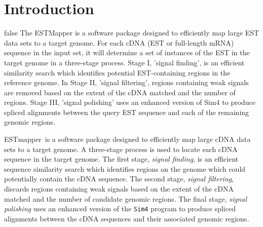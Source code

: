 \documentclass[twoside,11pt]{book}
\begin{document}
\pagestyle{fancy}

\rhead[]{}
\lhead[\today]{\today}


\newcommand{\ESTmapper}{{\sc ESTmapper}}

\normalem

%

\tableofcontents


\chapter{Introduction}
\label{chap:intro}

\if false
The ESTMapper is a software package designed to efficiently map large EST data
sets to a target genome. For each cDNA (EST or full-length mRNA) sequence
in the input set, it will determine a set of instances of the EST in the
target genome in a three-stage process. Stage I, 'signal finding', is an
efficient similarity search which identifies potential EST-containing regions
in the reference genome. In Stage II, 'signal filtering', regions containing
weak signals are removed based on the extent of the cDNA matched and the
number of regions. Stage III, 'signal polishing' uses an
enhanced version of Sim4 to produce spliced alignments between the
query EST sequence and each of the remaining genomic regions.
\fi


\ESTmapper\ is a software package designed to efficiently map large
cDNA data sets to a target genome.
%
A three-stage process is used to locate each cDNA sequence in the
target genome.
%
%
The first stage, {\em signal finding}, is an efficient sequence
similarity search which identifies regions on the genome which could
potentially contain the cDNA sequence.
%
The second stage, {\em signal filtering}, discards regions containing
weak signals based on the extent of the cDNA matched and the number of
candidate genomic regions.
%
The final stage, {\em signal polishing} uses an enhanced version of
the {\tt Sim4} program to produce spliced alignments between the 
cDNA sequences and their associated genomic regions.
\end{document}
